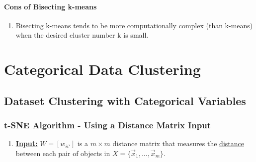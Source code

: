 \documentclass[11pt]{elegantbook}
\begin{document}
\subsubsection*{Cons of Bisecting k-means}
\begin{enumerate}[-]
    \item Bisecting k-means tends to be more computationally complex (than k-means) when the desired cluster number $\mathrm{k}$ is small.
\end{enumerate}


\chapter{Categorical Data Clustering}
\section{Dataset Clustering with Categorical Variables}
\subsection{ t-SNE Algorithm - Using a Distance Matrix Input}
\begin{enumerate}[]
    \item \textbf{\underline{Input:}} $W=[w_{ii'}]$ is a $m\times m$ distance matrix that measures the \underline{distance} between each pair of objects in $X=\{\vec{x}_1,...,\vec{x}_m\}$.
\end{enumerate}
\end{document}
